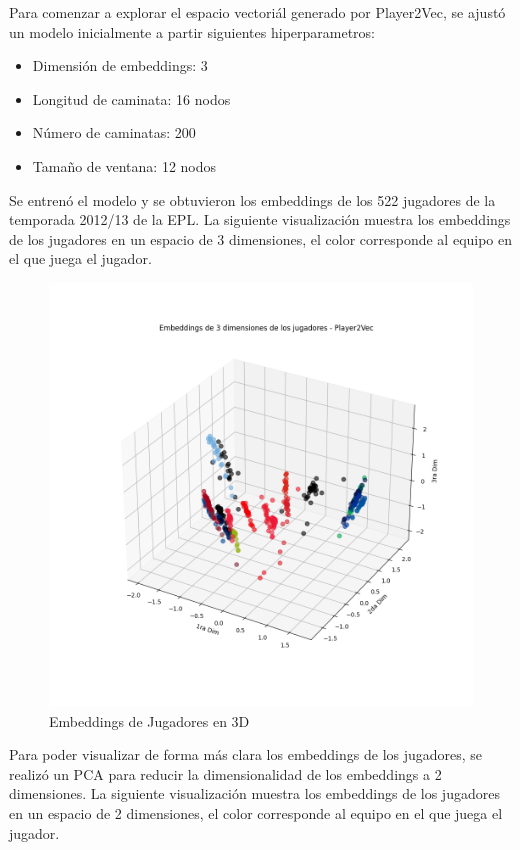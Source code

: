 \documentclass[
  a4paper,
]{article}
\providecommand{\tightlist}{%
  \setlength{\itemsep}{0pt}\setlength{\parskip}{0pt}}
\begin{document}
Para comenzar a explorar el espacio vectoriál generado por Player2Vec,
se ajustó un modelo inicialmente a partir siguientes hiperparametros:

\begin{itemize}
\tightlist
\item
  Dimensión de embeddings: 3
\item
  Longitud de caminata: 16 nodos
\item
  Número de caminatas: 200
\item
  Tamaño de ventana: 12 nodos
\end{itemize}

Se entrenó el modelo y se obtuvieron los embeddings de los 522 jugadores
de la temporada 2012/13 de la EPL. La siguiente visualización muestra
los embeddings de los jugadores en un espacio de 3 dimensiones, el color
corresponde al equipo en el que juega el jugador.

\begin{figure}
  \includegraphics{recursos_pdf/graficos/players_3d.png}
    \caption{Embeddings de Jugadores en 3D}
\end{figure}

Para poder visualizar de forma más clara los embeddings de los
jugadores, se realizó un PCA para reducir la dimensionalidad de los
embeddings a 2 dimensiones. La siguiente visualización muestra los
embeddings de los jugadores en un espacio de 2 dimensiones, el color
corresponde al equipo en el que juega el jugador.
\end{document}
